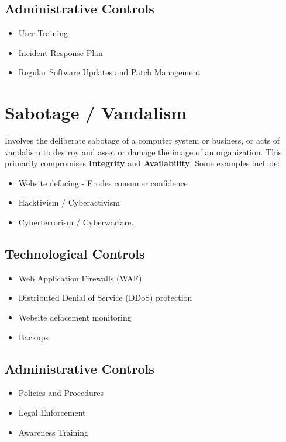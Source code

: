 \documentclass[12pt letter]{report}
\begin{document}
\subsection{Administrative Controls}

\begin{itemize}
  \item User Training
  \item Incident Response Plan
  \item Regular Software Updates and Patch Management
\end{itemize}

\section{Sabotage / Vandalism}



Involves the deliberate sabotage of a computer system or business, or acts of vandalism to destroy and asset or damage the image of an organization. This primarily compromises \textbf{Integrity} and \textbf{Availability}. Some examples include:

\begin{itemize}
  \item Website defacing - Erodes consumer confidence
  \item Hacktivism / Cyberactivism
  \item Cyberterrorism / Cyberwarfare.
\end{itemize}

\subsection{Technological Controls}

\begin{itemize}
  \item Web Application Firewalls (WAF)
  \item Distributed Denial of Service (DDoS) protection
  \item Website defacement monitoring
  \item Backups
\end{itemize}

\subsection{Administrative Controls}
\begin{itemize}
  \item Policies and Procedures
  \item Legal Enforcement
  \item Awareness Training
\end{itemize}
\end{document}
